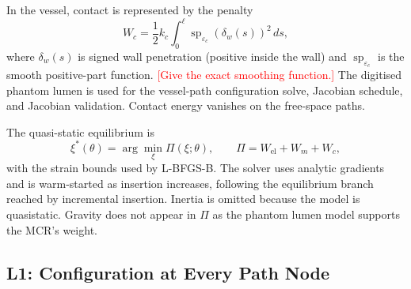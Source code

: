 \documentclass[journal]{IEEEtran}
\newcommand{\TBD}[1]{\textcolor{red}{[#1]}}
\begin{document}
In the vessel, contact is represented by the penalty
\begin{equation}
W_c=\frac12 k_c\int_0^\ell
\operatorname{sp}_{\varepsilon_c}(\delta_w(s))^2\,ds,
\label{eq:contact}
\end{equation}
where $\delta_w(s)$ is signed wall penetration (positive inside the
wall) and $\operatorname{sp}_{\varepsilon_c}$ is the smooth positive-part
function. \TBD{Give the exact smoothing function.}
The digitised phantom lumen is used for the vessel-path configuration
solve, Jacobian schedule, and Jacobian validation. Contact energy
vanishes on the free-space paths.

The quasi-static equilibrium is
\begin{equation}
\xi^*(\theta)=\arg\min_\xi\Pi(\xi;\theta),\qquad
\Pi=W_{\mathrm{el}}+W_m+W_c,
\label{eq:equilibrium}
\end{equation}
with the strain bounds used by L-BFGS-B. The solver uses analytic
gradients and is warm-started as insertion increases, following the
equilibrium branch reached by incremental insertion. Inertia is omitted because the model is quasistatic. Gravity does not
appear in $\Pi$ as the phantom lumen model supports the MCR's weight. 

\subsection{L1: Configuration at Every Path Node}
\label{sec:l1}
\end{document}
